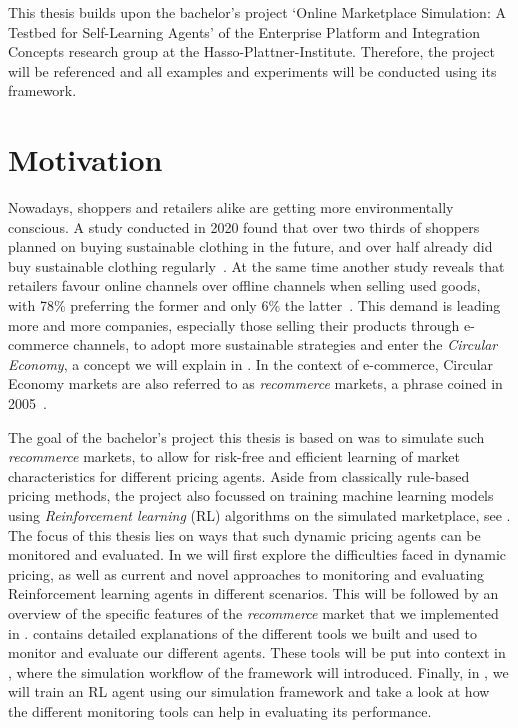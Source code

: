 \begin{jointwork}
	This thesis builds upon the bachelor's project `Online Marketplace Simulation: A Testbed for Self-Learning Agents' of the Enterprise Platform and Integration Concepts research group at the Hasso-Plattner-Institute. Therefore, the project will be referenced and all examples and experiments will be conducted using its framework.
\end{jointwork}

\section{Motivation}

Nowadays, shoppers and retailers alike are getting more environmentally conscious. A study conducted in 2020 found that over two thirds of shoppers planned on buying sustainable clothing in the future, and over half already did buy sustainable clothing regularly~\cite{StatistaSustainableClothing}. At the same time another study reveals that retailers favour online channels over offline channels when selling used goods, with 78\% preferring the former and only 6\% the latter~\cite{StatistaUsedRetailers}. This demand is leading more and more companies, especially those selling their products through e-commerce channels, to adopt more sustainable strategies and enter the \emph{Circular Economy}, a concept we will explain in . In the context of e-commerce, Circular Economy markets are also referred to as \emph{recommerce} markets, a phrase coined in 2005~\cite{RecommerceDefinition}.

The goal of the bachelor's project this thesis is based on was to simulate such \emph{recommerce} markets, to allow for risk-free and efficient learning of market characteristics for different pricing agents. Aside from classically rule-based pricing methods, the project also focussed on training machine learning models using \emph{Reinforcement learning} (RL) algorithms on the simulated marketplace, see . The focus of this thesis lies on ways that such dynamic pricing agents can be monitored and evaluated. In  we will first explore the difficulties faced in dynamic pricing, as well as current and novel approaches to monitoring and evaluating Reinforcement learning agents in different scenarios. This will be followed by an overview of the specific features of the \emph{recommerce} market that we implemented in .  contains detailed explanations of the different tools we built and used to monitor and evaluate our different agents. These tools will be put into context in , where the simulation workflow of the framework will introduced. Finally, in , we will train an RL agent using our simulation framework and take a look at how the different monitoring tools can help in evaluating its performance.

